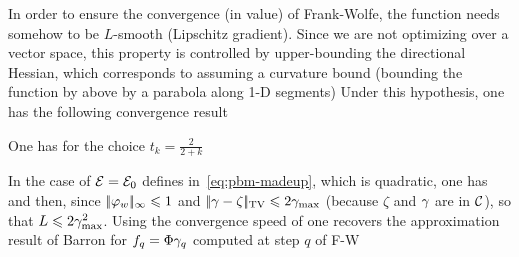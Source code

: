 In order to ensure the convergence (in value) of Frank-Wolfe, the function needs somehow to be $L$-smooth (Lipschitz gradient). Since we are not optimizing over a vector space, this property is controlled by upper-bounding the directional Hessian, which corresponds to assuming a curvature bound (bounding the function by above by a parabola along 1-D segments)
Under this hypothesis, one has the following convergence result
\begin{prop}
		One has for the choice $t_k = \frac{2}{2+k}$
\end{prop}


In the case of $\mathcal{E}=\mathcal{E}_0$ defines in~\eqref{eq:pbm-madeup}, which is quadratic, one has
and then, since $|\!| \varphi_w |\!|_\infty \leqslant 1$ and $|\!| \gamma - \zeta |\!|_{\operatorname{TV}} \leqslant 2\gamma_{\max}$ (because $\zeta$ and $\gamma$ are in $\mathcal{C}$), 
so that $L \leqslant 2\gamma_{\max}^2$.
%
Using the convergence speed of  one recovers the approximation result of Barron for $f_q = \Phi \gamma_q$ computed at step $q$ of F-W

%
%
%

